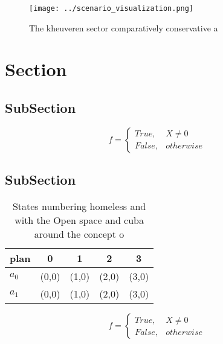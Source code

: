 \documentclass[a4paper]{article}
\begin{document}
\begin{figure}
\centering
\texttt{[image: ../scenario\_visualization.png]}
\caption{The kheuveren sector comparatively conservative a
}
\end{figure}
 
\section{Section}

\subsection{SubSection}

\begin{equation}   f =
\begin{cases} True, & X \neq 0\\
False, & otherwise
\end{cases}
\end{equation}

\subsection{SubSection}

\begin{table}
\begin{adjustbox}{width=0.5\columnwidth}
\begin{tabular}{|l|l|l|l|l|}
\hline
\textbf{plan} & \multicolumn{1}{c|}{\textbf{0}} & \multicolumn{1}{c|}{\textbf{1}} & \multicolumn{1}{c|}{\textbf{2}} & \multicolumn{1}{c|}{\textbf{3}} \\ \hline
\textbf{$a_0$}  & (0,0) & (1,0) & (2,0) & (3,0) \\ \hline
\textbf{$a_1$}  & (0,0) & (1,0) & (2,0) & (3,0) \\ \hline
\end{tabular}
\end{adjustbox}
\caption{States numbering homeless and with the Open space and cuba around the concept o
}
\end{table}

\begin{equation}   f =
\begin{cases} True, & X \neq 0\\
False, & otherwise
\end{cases}
\end{equation}
\end{document}
